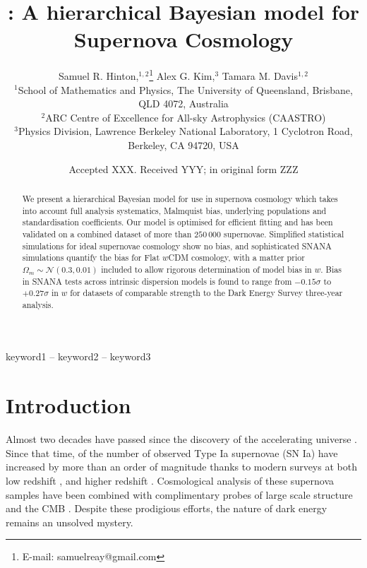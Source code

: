 \documentclass[a4paper,fleqn,usenatbib]{mnras}
\title[\name]{\name: A hierarchical Bayesian model for Supernova Cosmology}
\author[S. R. Hinton et al.]{
	Samuel R. Hinton,$^{1,2}$\thanks{E-mail: samuelreay@gmail.com}
	Alex G. Kim,$^{3}$
	Tamara M. Davis$^{1,2}$
	\\
	$^{1}$School of Mathematics and Physics, The University of Queensland, Brisbane, QLD 4072, Australia\\
	$^{2}$ARC Centre of Excellence for All-sky Astrophysics (CAASTRO)\\
	$^{3}$Physics Division, Lawrence Berkeley National Laboratory, 1 Cyclotron Road, Berkeley, CA 94720, USA
}
\date{Accepted XXX. Received YYY; in original form ZZZ}
\begin{document}
\label{firstpage}
\pagerange{\pageref{firstpage}--\pageref{lastpage}}
\maketitle











\begin{abstract}
We present a hierarchical Bayesian model for use in supernova cosmology which takes into account full analysis systematics, Malmquist bias, underlying populations and standardisation coefficients. Our model is optimised for efficient fitting and has been validated on a combined dataset of more than $250\,000$ supernovae. Simplified statistical simulations for ideal supernovae cosmology show no bias, and sophisticated SNANA simulations quantify the bias for Flat $w$CDM cosmology, with a matter prior $\Omega_m \sim \mathcal{N}(0.3, 0.01)$ included to allow rigorous determination of model bias in $w$. Bias in SNANA tests across intrinsic dispersion models is found to range from $-0.15\sigma$ to $+0.27\sigma$ in $w$ for datasets of comparable strength to the Dark Energy Survey three-year analysis. 
\end{abstract}

\begin{keywords}
keyword1 -- keyword2 -- keyword3
\end{keywords}










\section{Introduction}

Almost two decades have passed since the discovery of the accelerating universe \citep{Riess1998, Perlmutter1999}. Since that time, of the number of observed Type Ia supernovae (SN Ia) have increased by more than an order of magnitude thanks to modern surveys at both low redshift \citep{Bailey2008, Freedman2009, Hicken2009,  Contreras2010, Conley2011}, and higher redshift \citep{Astier2006, Wood-Vasey2007, Balland2009, Amanullah2010}. Cosmological analysis of these supernova samples \citep{Kowalski2008, Conley2011, Suzuki2012, Betoule2014, Rest2014} have been combined with complimentary probes of large scale structure \citep{Alam2017} and the CMB \citep{Hinshaw2013, PlanckCollaboration2013}. Despite these prodigious efforts, the nature of dark energy remains an unsolved mystery.
\end{document}

